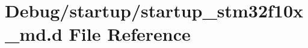 \hypertarget{startup__stm32f10x__md_8d}{}\section{Debug/startup/startup\+\_\+stm32f10x\+\_\+md.d File Reference}
\label{startup__stm32f10x__md_8d}
